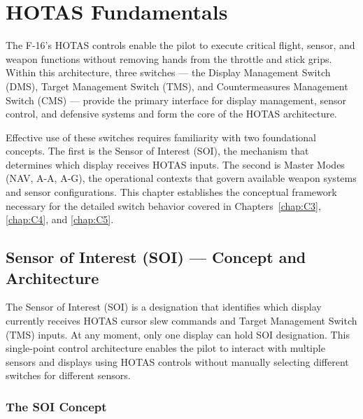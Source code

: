 \documentclass[11pt, a4paper, twoside]{report}
\begin{document}
\chapter{HOTAS Fundamentals}
\label{chap:C2}

The F-16's HOTAS controls enable the pilot to execute critical flight, sensor, and weapon functions without removing hands from the throttle and stick grips. Within this architecture, three switches — the Display Management Switch (DMS), Target Management Switch (TMS), and Countermeasures Management Switch (CMS) — provide the primary interface for display management, sensor control, and defensive systems and form the core of the HOTAS architecture.

Effective use of these switches requires familiarity with two foundational concepts. The first is the Sensor of Interest (SOI), the mechanism that determines which display receives HOTAS inputs. The second is Master Modes (NAV, A-A, A-G), the operational contexts that govern available weapon systems and sensor configurations. This chapter establishes the conceptual framework necessary for the detailed switch 
behavior covered in Chapters~\ref{chap:C3}, \ref{chap:C4}, and \ref{chap:C5}.


\section{Sensor of Interest (SOI) — Concept and Architecture}
\label{sec:C2-S1}

The Sensor of Interest (SOI) is a designation that identifies which display currently receives HOTAS cursor slew commands and Target Management Switch (TMS) inputs. At any moment, only one display can hold SOI designation. This single-point control architecture enables the pilot to interact with multiple sensors and displays using HOTAS controls without manually selecting different switches for different sensors.


\subsection{The SOI Concept}
\label{sec:C2-S1-S1}
\end{document}
